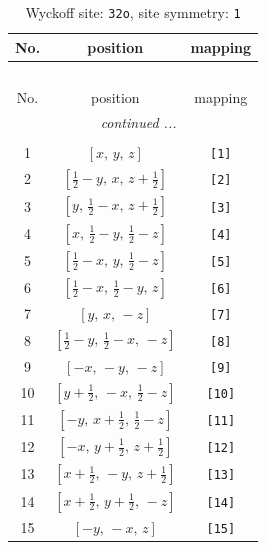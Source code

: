\documentclass[fleqn,8pt]{jsarticle}
\begin{document}
\renewcommand{\arraystretch}{1.2}
\begin{longtable}{ccc}
\caption{Wyckoff site: {\tt 32o}, site symmetry: {\tt 1}}
 \\
 \hline \hline
No. & position & mapping \\ \hline \endfirsthead

\multicolumn{2}{l}{\tablename\ \thetable{}} \\
 \hline \hline
No. & position & mapping \\ \hline \endhead

 \hline \hline
\multicolumn{2}{r}{\footnotesize\it continued ...} \\ \endfoot

 \hline \hline
\multicolumn{2}{r}{} \\ \endlastfoot

1 & $\left[ x,\, y,\, z \right]$ & {\tt [1]} \\ \hline
2 & $\left[ \frac{1}{2} - y,\, x,\, z + \frac{1}{2} \right]$ & {\tt [2]} \\ \hline
3 & $\left[ y,\, \frac{1}{2} - x,\, z + \frac{1}{2} \right]$ & {\tt [3]} \\ \hline
4 & $\left[ x,\, \frac{1}{2} - y,\, \frac{1}{2} - z \right]$ & {\tt [4]} \\ \hline
5 & $\left[ \frac{1}{2} - x,\, y,\, \frac{1}{2} - z \right]$ & {\tt [5]} \\ \hline
6 & $\left[ \frac{1}{2} - x,\, \frac{1}{2} - y,\, z \right]$ & {\tt [6]} \\ \hline
7 & $\left[ y,\, x,\, - z \right]$ & {\tt [7]} \\ \hline
8 & $\left[ \frac{1}{2} - y,\, \frac{1}{2} - x,\, - z \right]$ & {\tt [8]} \\ \hline
9 & $\left[ - x,\, - y,\, - z \right]$ & {\tt [9]} \\ \hline
10 & $\left[ y + \frac{1}{2},\, - x,\, \frac{1}{2} - z \right]$ & {\tt [10]} \\ \hline
11 & $\left[ - y,\, x + \frac{1}{2},\, \frac{1}{2} - z \right]$ & {\tt [11]} \\ \hline
12 & $\left[ - x,\, y + \frac{1}{2},\, z + \frac{1}{2} \right]$ & {\tt [12]} \\ \hline
13 & $\left[ x + \frac{1}{2},\, - y,\, z + \frac{1}{2} \right]$ & {\tt [13]} \\ \hline
14 & $\left[ x + \frac{1}{2},\, y + \frac{1}{2},\, - z \right]$ & {\tt [14]} \\ \hline
15 & $\left[ - y,\, - x,\, z \right]$ & {\tt [15]} \\ \hline

\end{longtable}
\end{document}
